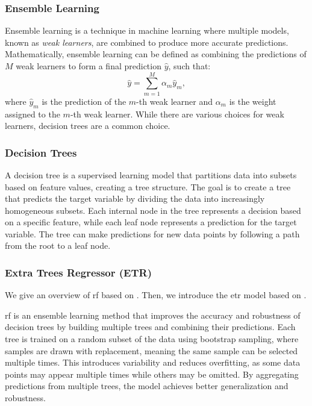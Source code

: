 \subsubsection{Ensemble Learning}
Ensemble learning is a technique in machine learning where multiple models, known as \textit{weak learners}, are combined to produce more accurate predictions.
Mathematically, ensemble learning can be defined as combining the predictions of $M$ weak learners to form a final prediction $\hat{y}$, such that:
\begin{equation}
    \hat{y} = \sum_{m=1}^{M} \alpha_m \hat{y}_m,
\end{equation}
where $\hat{y}_m$ is the prediction of the $m$-th weak learner and $\alpha_m$ is the weight assigned to the $m$-th weak learner.
While there are various choices for weak learners, decision trees are a common choice\cite{James2023AnIS}.

\subsubsection{Decision Trees}
A decision tree is a supervised learning model that partitions data into subsets based on feature values, creating a tree structure.
The goal is to create a tree that predicts the target variable by dividing the data into increasingly homogeneous subsets.
Each internal node in the tree represents a decision based on a specific feature, while each leaf node represents a prediction for the target variable.
The tree can make predictions for new data points by following a path from the root to a leaf node\cite{James2023AnIS}.

\subsubsection{Extra Trees Regressor (ETR)}
We give an overview of \gls{rf} based on \citet{James2023AnIS}.
Then, we introduce the \gls{etr} model based on \citet{geurtsERF}.

\gls{rf} is an ensemble learning method that improves the accuracy and robustness of decision trees by building multiple trees and combining their predictions.
Each tree is trained on a random subset of the data using bootstrap sampling, where samples are drawn with replacement, meaning the same sample can be selected multiple times.
This introduces variability and reduces overfitting, as some data points may appear multiple times while others may be omitted.
By aggregating predictions from multiple trees, the model achieves better generalization and robustness.


